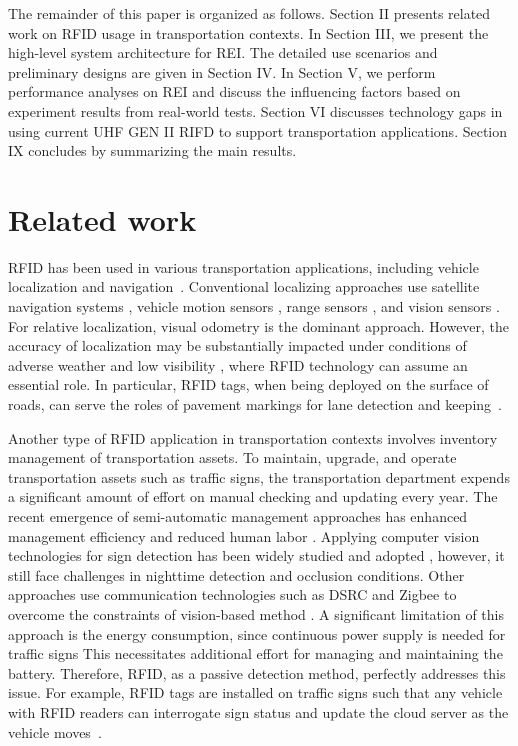 \documentclass[lettersize,journal]{IEEEtran}
\begin{document}
The remainder of this paper is organized as follows. Section II presents related work on RFID usage in transportation contexts. In Section III, we present the high-level system architecture for REI. The detailed use scenarios and preliminary designs are given in Section IV. In Section V, we perform performance analyses on REI and discuss the influencing factors based on experiment results from real-world tests. Section VI discusses technology gaps in using current UHF GEN II RIFD to support transportation applications. Section IX concludes by summarizing the main results. 

\section{Related work}
RFID has been used in various transportation applications, including vehicle localization and navigation~\cite{khosyi2020tests,meghana2017comprehensive,naik2018rfid,qin2021collision,wang2014rfid,suo2023rf}. Conventional localizing approaches use satellite navigation systems \cite{shi2022beyond}, vehicle motion sensors \cite{gao2022improved,trogh2020map}, range sensors \cite{burnett2022we}, and vision sensors \cite{gurghian2016deeplanes,tarel2009fast}. For relative localization, visual odometry is the dominant approach. However, the accuracy of localization may be substantially impacted under conditions of adverse weather and low visibility \cite{rasshofer2005automotive}, where RFID technology can assume an essential role. In particular, RFID tags, when being deployed on the surface of roads, can serve the roles of pavement markings for lane detection and keeping~\cite{cheng2011design,javaid2021autonomous,kawamura2014intelligent,zheng2016lane}.

Another type of RFID application in transportation contexts involves inventory management of transportation assets. To maintain, upgrade, and operate transportation assets such as traffic signs, the transportation department expends a significant amount of effort on manual checking and updating every year. The recent emergence of semi-automatic management approaches has enhanced management efficiency and reduced human labor \cite{ellison2008tapping}. Applying computer vision technologies for sign detection has been widely studied and adopted \cite{tabernik2019deep,maldonado2008traffic}, however, it still face challenges in nighttime detection and occlusion conditions. Other approaches use communication technologies such as DSRC and Zigbee to overcome the constraints of vision-based method \cite{li2009traffic,wang2021traffic,garcia2011robust}. A significant limitation of this approach is the energy consumption, since continuous power supply is needed for traffic signs This necessitates additional effort for managing and maintaining the battery. Therefore, RFID, as a passive detection method, perfectly addresses this issue. For example, RFID tags are installed on traffic signs such that any vehicle with RFID readers can interrogate sign status and update the cloud server as the vehicle moves~\cite{chen2022rfid,garcia2018passive,hidalgo2013wireless}.
\end{document}
